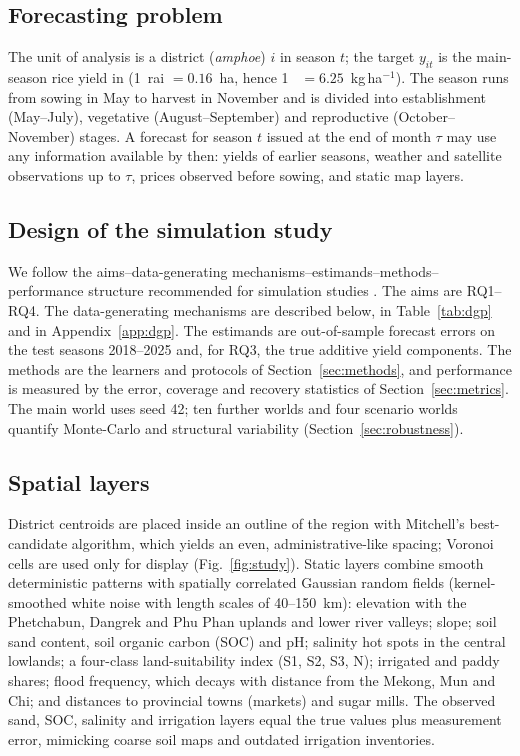 \subsection{Forecasting problem}
The unit of analysis is a district (\emph{amphoe}) $i$ in season $t$; the target $y_{it}$ is the main-season rice yield in \kgrai{} (1~rai $=0.16$~ha, hence 1~\kgrai{} $=6.25$~kg\,ha$^{-1}$). The season runs from sowing in May to harvest in November and is divided into establishment (May--July), vegetative (August--September) and reproductive (October--November) stages. A forecast for season $t$ issued at the end of month $\tau$ may use any information available by then: yields of earlier seasons, weather and satellite observations up to $\tau$, prices observed before sowing, and static map layers.

\subsection{Design of the simulation study}
We follow the aims--data-generating mechanisms--estimands--methods--performance structure recommended for simulation studies \citep{morris2019using}. The aims are RQ1--RQ4. The data-generating mechanisms are described below, in Table~\ref{tab:dgp} and in Appendix~\ref{app:dgp}. The estimands are out-of-sample forecast errors on the test seasons 2018--2025 and, for RQ3, the true additive yield components. The methods are the learners and protocols of Section~\ref{sec:methods}, and performance is measured by the error, coverage and recovery statistics of Section~\ref{sec:metrics}. The main world uses seed 42; ten further worlds and four scenario worlds quantify Monte-Carlo and structural variability (Section~\ref{sec:robustness}).

\subsection{Spatial layers}\label{sec:design-spatial}
District centroids are placed inside an outline of the region with Mitchell's best-candidate algorithm, which yields an even, administrative-like spacing; Voronoi cells are used only for display (Fig.~\ref{fig:study}). Static layers combine smooth deterministic patterns with spatially correlated Gaussian random fields (kernel-smoothed white noise with length scales of 40--150~km): elevation with the Phetchabun, Dangrek and Phu Phan uplands and lower river valleys; slope; soil sand content, soil organic carbon (SOC) and pH; salinity hot spots in the central lowlands; a four-class land-suitability index (S1, S2, S3, N); irrigated and paddy shares; flood frequency, which decays with distance from the Mekong, Mun and Chi; and distances to provincial towns (markets) and sugar mills. The observed sand, SOC, salinity and irrigation layers equal the true values plus measurement error, mimicking coarse soil maps and outdated irrigation inventories.

